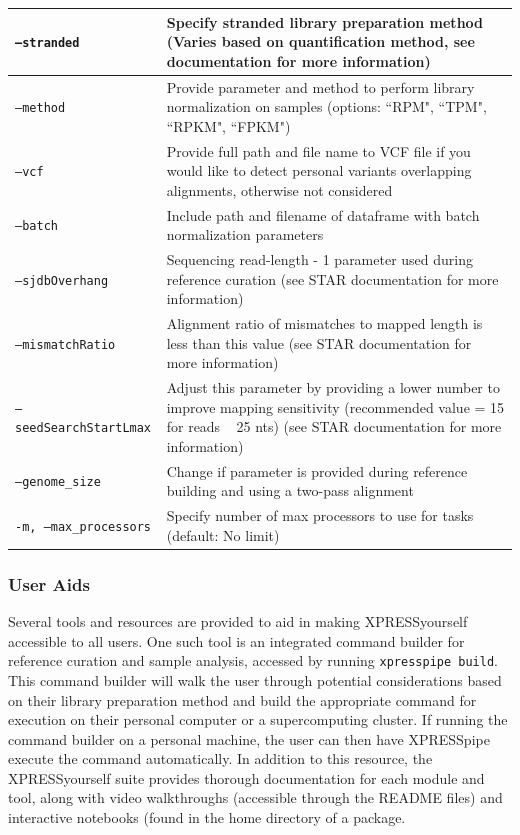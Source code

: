 \documentclass[10pt, oneside]{article}
\begin{document}
\begin{table}[!]
\begin{tabular}{p{5cm}p{13cm}}
 \hline
 \texttt{--stranded} & Specify stranded library preparation method (Varies based on quantification method, see documentation for more information) \\
 \hline
 \texttt{--method} & Provide parameter and method to perform library normalization on samples (options: ``RPM", ``TPM", ``RPKM", ``FPKM") \\
 \hline
 \texttt{--vcf} & Provide full path and file name to VCF file if you would like to detect personal variants overlapping alignments, otherwise not considered \\
 \hline
 \texttt{--batch} & Include path and filename of dataframe with batch normalization parameters \\
 \hline
 \texttt{--sjdbOverhang} & Sequencing read-length - 1 parameter used during reference curation (see STAR documentation for more information) \\
 \hline
 \texttt{--mismatchRatio} & Alignment ratio of mismatches to mapped length is less than this value (see STAR documentation for more information) \\
 \hline
 \texttt{--seedSearchStartLmax} & Adjust this parameter by providing a lower number to improve mapping sensitivity (recommended value = 15 for reads ~ 25 nts) (see STAR documentation for more information) \\
 \hline
 \texttt{--genome\_size} & Change if parameter is provided during reference building and using a two-pass alignment \\
 \hline
 \texttt{-m, --max\_processors} & Specify number of max processors to use for tasks (default: No limit) \\
\end{tabular}
\end{table}

\subsubsection{User Aids}
Several tools and resources are provided to aid in making XPRESSyourself accessible to all users. One such tool is an integrated command builder for reference curation and sample analysis, accessed by running \texttt{xpresspipe build}. This command builder will walk the user through potential considerations based on their library preparation method and build the appropriate command for execution on their personal computer or a supercomputing cluster. If running the command builder on a personal machine, the user can then have XPRESSpipe execute the command automatically. In addition to this resource, the XPRESSyourself suite provides thorough documentation for each module and tool, along with video walkthroughs (accessible through the README files) and interactive notebooks (found in the home directory of a package.
\end{document}
